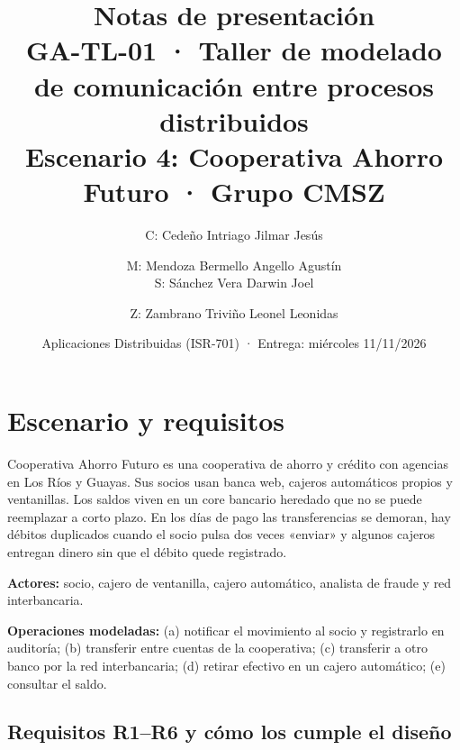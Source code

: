 \documentclass[11pt,a4paper]{article}
\title{\textbf{Notas de presentación}\\[4pt]
\large GA-TL-01 · Taller de modelado de comunicación entre procesos distribuidos\\
Escenario 4: Cooperativa Ahorro Futuro · Grupo CMSZ}
\author{C: Cedeño Intriago Jilmar Jesús \and M: Mendoza Bermello Angello Agustín \\
        S: Sánchez Vera Darwin Joel \and Z: Zambrano Triviño Leonel Leonidas}
\date{Aplicaciones Distribuidas (ISR-701) · Entrega: miércoles 11/11/2026}
\begin{document}
\maketitle

\section{Escenario y requisitos}
Cooperativa Ahorro Futuro es una cooperativa de ahorro y crédito con agencias en Los Ríos y
Guayas. Sus socios usan banca web, cajeros automáticos propios y ventanillas. Los saldos viven en
un core bancario heredado que no se puede reemplazar a corto plazo. En los días de pago las
transferencias se demoran, hay débitos duplicados cuando el socio pulsa dos veces «enviar» y
algunos cajeros entregan dinero sin que el débito quede registrado.

\textbf{Actores:} socio, cajero de ventanilla, cajero automático, analista de fraude y red
interbancaria.

\textbf{Operaciones modeladas:} (a) notificar el movimiento al socio y registrarlo en auditoría;
(b) transferir entre cuentas de la cooperativa; (c) transferir a otro banco por la red
interbancaria; (d) retirar efectivo en un cajero automático; (e) consultar el saldo.

\subsection*{Requisitos R1--R6 y cómo los cumple el diseño}
\end{document}
